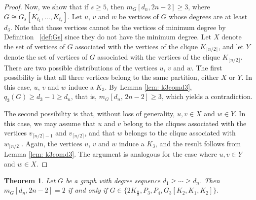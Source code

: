\documentclass[preprint,12pt]{elsarticle}
\newtheorem{theorem}{Theorem}[section]
\begin{document}
\begin{proof}
Now, we show that if $s \geq 5$, then $m_G[d_n, 2n-2] \geq 3$, where $G \cong G_s[K_{t_1}, \ldots, K_{t_s}]$. Let $u$, $v$ and $w$ be vertices of $G$ whose degrees are at least $d_3$.  Note that those vertices cannot be the vertices of minimum degree by Definition ~\ref{def:Gs} since they do not have the minimum degree. Let $X$ denote the set of vertices of $G$ associated with the vertices of the clique $K_{\lceil n/2 \rceil}$, and let $Y$ denote the set of vertices of $G$ associated with the vertices of the clique $K_{\lfloor n/2 \rfloor}$. There are two possible distributions of the vertices $u$, $v$ and $w$. The first possibility is that all three vertices belong to the same partition, either $X$ or $Y$. In this case, $u$, $v$ and $w$ induce a $K_3$. By Lemma \ref{lem: k3comd3},
$q_3(G) \geq d_3 - 1 \geq d_n$, that is, $m_G[d_n,\, 2n-2] \geq 3$, which yields a contradiction.

The second possibility is that, without loss of generality, $u, v \in X$ and $w \in Y$. In this case, we may assume that $u$ and $v$ belong to the cliques associated with the vertices $v_{\lceil n/2 \rceil - 1}$ and $v_{\lceil n/2 \rceil}$, and that $w$ belongs to the clique associated with $w_{\lfloor n/2 \rfloor}$. Again, the vertices $u$, $v$ and $w$ induce a $K_3$, and the result follows from Lemma \ref{lem: k3comd3}.
The argument is analogous for the case where $u, v \in Y$ and $w \in X$.
\end{proof}

\begin{theorem}
Let \( G \) be a graph with degree sequence \( d_1 \geq \cdots \geq d_n \). Then \( m_G [d_n, 2n-2] = 2 \) if and only if {$
G \in \{ 2K_{\frac{n}{2}}, P_3, P_4, G_3[K_2, K_1, K_2] \}.
$}

\end{theorem}
\end{document}
